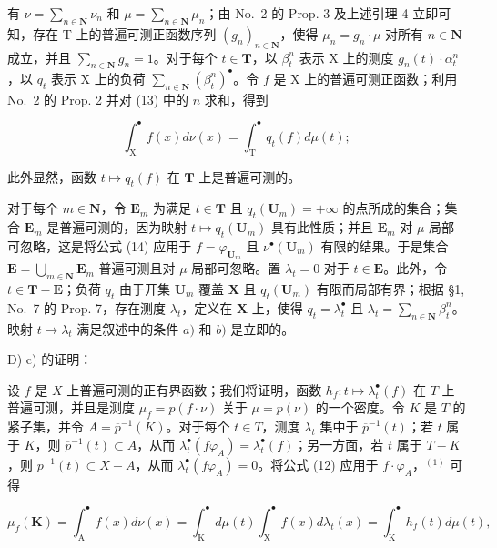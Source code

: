 有 \(\nu = \sum_{n\in \mathbf{N}}\nu_n\) 和 \(\mu = \sum_{n\in \mathbf{N}}\mu_n\)；由 No.~2 的 Prop. 3 及上述引理 4 立即可知，存在 T 上的普遍可测正函数序列 \((g_n)_{n\in \mathbf{N}}\)，使得 \(\mu_{n} = g_{n}\cdot \mu\) 对所有 \(n\in \mathbf{N}\) 成立，并且 \(\sum_{n\in \mathbf{N}}g_n = 1\)。对于每个 \(t\in \mathbf{T}\)，以 \(\beta_t^n\) 表示 X 上的测度 \(g_{n}(t)\cdot \alpha_{t}^{n}\)，以 \(q_{t}\) 表示 X 上的负荷 \(\sum_{n\in \mathbf{N}}(\beta_t^n)^{\bullet}\)。令 \(f\) 是 X 上的普遍可测正函数；利用 No.~2 的 Prop. 2 并对 (13) 中的 \(n\) 求和，得到

\[
\int_ {\mathrm{X}} ^ {\bullet} f (x) d \nu (x) = \int_ {\mathrm{T}} ^ {\bullet} q _ {t} (f) d \mu (t);\tag{14}
\]

此外显然，函数 \(t \mapsto q_t(f)\) 在 \(\mathbf{T}\) 上是普遍可测的。

对于每个 \(m \in \mathbf{N}\)，令 \(\mathbf{E}_m\) 为满足 \(t \in \mathbf{T}\) 且 \(q_t(\mathbf{U}_m) = +\infty\) 的点所成的集合；集合 \(\mathbf{E}_m\) 是普遍可测的，因为映射 \(t \mapsto q_t(\mathbf{U}_m)\) 具有此性质；并且 \(\mathbf{E}_m\) 对 \(\mu\) 局部可忽略，这是将公式 (14) 应用于 \(f = \varphi_{\mathbf{U}_m}\) 且 \(\nu^\bullet(\mathbf{U}_m)\) 有限的结果。于是集合 \(\mathbf{E} = \bigcup_{m \in \mathbf{N}} \mathbf{E}_m\) 普遍可测且对 \(\mu\) 局部可忽略。置 \(\lambda_t = 0\) 对于 \(t \in \mathbf{E}\)。此外，令 \(t \in \mathbf{T} - \mathbf{E}\)；负荷 \(q_t\) 由于开集 \(\mathbf{U}_m\) 覆盖 \(\mathbf{X}\) 且 \(q_t(\mathbf{U}_m)\) 有限而局部有界；根据 §1, No.~7 的 Prop. 7，存在测度 \(\lambda_t\)，定义在 \(\mathbf{X}\) 上，使得 \(q_t = \lambda_t^\bullet\) 且 \(\lambda_t = \sum_{n \in \mathbf{N}} \beta_t^n\)。映射 \(t \mapsto \lambda_t\) 满足叙述中的条件 \(a)\) 和 \(b)\) 是立即的。

D) c) 的证明：

设 \(f\) 是 \(X\) 上普遍可测的正有界函数；我们将证明，函数 \(h_f: t \mapsto \lambda_t^\bullet(f)\) 在 \(T\) 上普遍可测，并且是测度 \(\mu_f = p(f \cdot \nu)\) 关于 \(\mu = p(\nu)\) 的一个密度。令 \(K\) 是 \(T\) 的紧子集，并令 \(A = \overline{p}^{-1}(K)\)。对于每个 \(t \in T\)，测度 \(\lambda_t\) 集中于 \(\overline{p}^{-1}(t)\)；若 \(t\) 属于 \(K\)，则 \(\overline{p}^{-1}(t) \subset A\)，从而 \(\lambda_t^\bullet(f\varphi_A) = \lambda_t^\bullet(f)\)；另一方面，若 \(t\) 属于 \(T - K\)，则 \(\overline{p}^{-1}(t) \subset X - A\)，从而 \(\lambda_t^\bullet(f\varphi_A) = 0\)。将公式 (12) 应用于 \(f \cdot \varphi_A\)，\(^{(1)}\) 可得

\[
\mu_ {f} (\mathbf {K}) = \int_ {\mathrm{A}} ^ {\bullet} f (x) d \nu (x) = \int_ {\mathrm{K}} ^ {\bullet} d \mu (t) \int_ {\mathrm{X}} ^ {\bullet} f (x) d \lambda_ {t} (x) = \int_ {\mathrm{K}} ^ {\bullet} h _ {f} (t) d \mu (t),
\]

